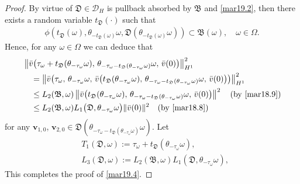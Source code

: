 \documentclass{elsarticle}
\theoremstyle{definition}
\numberwithin{equation}{section}
\newcommand{\D}{\mathcal{D}}
\begin{document}
\begin{proof}
By virtue of ${\mathfrak D} \in \D_H$   is pullback absorbed by $\mathfrak B$ and \eqref{mar19.2}, then  there exists  a random variable $  t_{\mathfrak D} (\cdot) $ such that
\begin{align}\label{mar19.5}
 \phi \left (  t_{\mathfrak D}(\omega) , \theta_{-  t_{\mathfrak D}(\omega)}\omega, \mathfrak D(\theta_{-  t_{\mathfrak D}(\omega)}\omega) \right) \subset \mathfrak B(\omega), \quad \omega\in \Omega.
\end{align}
Hence,    for any $ \omega\in \Omega $   we can deduce that
\begin{align*}
&   \left \|  \bar v  \!\left( \tau_\omega+   t_{\mathfrak D}(\theta_{-\tau_\omega} \omega)   , \, \theta_{-\tau_\omega  - t_{\mathfrak D}(\theta_{-\tau_\omega} \omega)}
 \omega, \, \bar v(0)\right)
   \right \|^2_{H^1}
    \nonumber \\
         &\quad = \left \| \bar v  \! \left( \tau_\omega  , \, \theta_{-\tau_\omega   }
 \omega, \,  \bar v \big(   t_{\mathfrak D}(\theta_{-\tau_\omega} \omega) ,\,  \theta_{-\tau_\omega- t_{\mathfrak D}(\theta_{-\tau_\omega} \omega)  }
 \omega,  \, \bar v(0)\big) \right)
   \right \|^2_{H^1} \nonumber
   \\
 &
  \quad \leq  L_2  (\mathfrak B,   \omega  )   \left \|  \bar v \!  \left( t_{\mathfrak D}(\theta_{-\tau_\omega} \omega),\,  \theta_{-\tau_\omega- t_{\mathfrak D}(\theta_{-\tau_\omega} \omega)    }
 \omega, \,  \bar v(0) \right)
   \right \|^2  \quad \text{(by \eqref{mar18.9})} \nonumber \\
 &\quad \leq     L_2  (\mathfrak B,   \omega  )   L_1  \big (\mathfrak D, \theta_{-\tau_\omega}\omega  \big)  \|\bar{v}(0)\|^2  \quad \text{(by \eqref{mar18.8})}
 \nonumber
\end{align*}
for any $\textbf{v}_{1,0}$, $\textbf{v}_{2,0}\in \mathfrak D \left (  \theta_{-\tau_\omega  - t_{\mathfrak D}(\theta_{-\tau_\omega} \omega)} \omega \right)$.  Let
\begin{align*}
 & T_1({\mathfrak D,\omega}) := \tau_\omega + t_{\mathfrak D}(\theta_{-\tau_\omega} \omega) ,  \\
 & L_3(\mathfrak D,\omega):=  L_2 \left (\mathfrak B,    \omega \right )   L_1 \left(\mathfrak D, \theta_{-\tau_\omega}\omega  \right) ,
\end{align*}
This completes the proof of \eqref{mar19.4}.


\end{proof}
\end{document}
